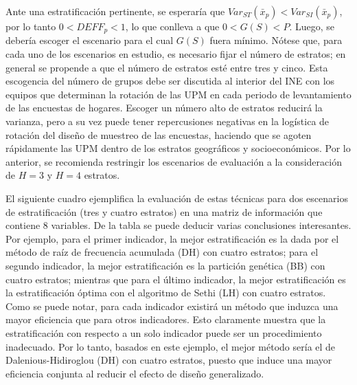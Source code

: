\documentclass[
  12pt,
]{book}
\begin{document}
Ante una estratificación pertinente, se esperaría que \(Var_{ST}(\bar x _p) < Var_{SI}(\bar x _p)\), por lo tanto \(0 < DEFF_p < 1\), lo que conlleva a que \(0 < G(S) < P\). Luego, se debería escoger el escenario para el cual \(G(S)\) fuera mínimo. Nótese que, para cada uno de los escenarios en estudio, es necesario fijar el número de estratos; en general se propende a que el número de estratos esté entre tres y cinco. Esta escogencia del número de grupos debe ser discutida al interior del INE con los equipos que determinan la rotación de las UPM en cada periodo de levantamiento de las encuestas de hogares. Escoger un número alto de estratos reducirá la varianza, pero a su vez puede tener repercusiones negativas en la logística de rotación del diseño de muestreo de las encuestas, haciendo que se agoten rápidamente las UPM dentro de los estratos geográficos y socioeconómicos. Por lo anterior, se recomienda restringir los escenarios de evaluación a la consideración de \(H=3\) y \(H=4\) estratos.

El siguiente cuadro ejemplifica la evaluación de estas técnicas para dos escenarios de estratificación (tres y cuatro estratos) en una matriz de información que contiene 8 variables. De la tabla se puede deducir varias conclusiones interesantes. Por ejemplo, para el primer indicador, la mejor estratificación es la dada por el método de raíz de frecuencia acumulada (DH) con cuatro estratos; para el segundo indicador, la mejor estratificación es la partición genética (BB) con cuatro estratos; mientras que para el último indicador, la mejor estratificación es la estratificación óptima con el algoritmo de Sethi (LH) con cuatro estratos. Como se puede notar, para cada indicador existirá un método que induzca una mayor eficiencia que para otros indicadores. Esto claramente muestra que la estratificación con respecto a un solo indicador puede ser un procedimiento inadecuado. Por lo tanto, basados en este ejemplo, el mejor método sería el de Dalenious-Hidiroglou (DH) con cuatro estratos, puesto que induce una mayor eficiencia conjunta al reducir el efecto de diseño generalizado.

\footnotesize
\end{document}
